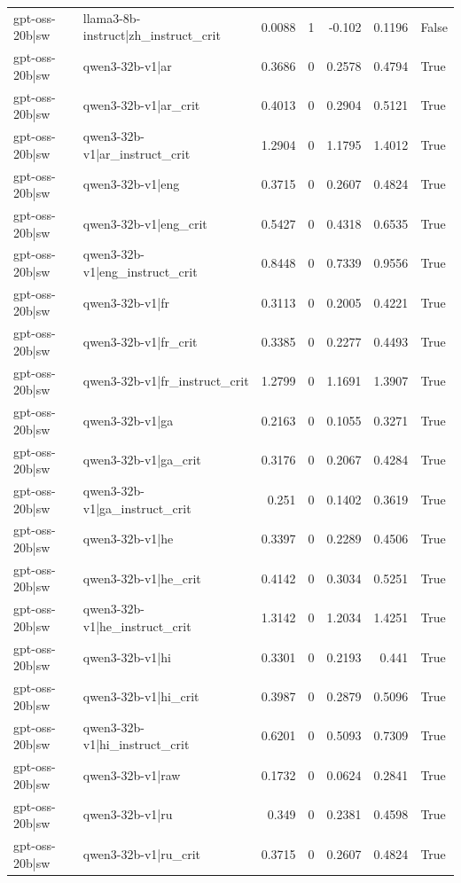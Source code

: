 \begin{table}
\begin{tabular}{l l r r r r l}
gpt-oss-20b|sw & llama3-8b-instruct|zh_instruct_crit & 0.0088 & 1 & -0.102 & 0.1196 & False \\
gpt-oss-20b|sw & qwen3-32b-v1|ar & 0.3686 & 0 & 0.2578 & 0.4794 & True \\
gpt-oss-20b|sw & qwen3-32b-v1|ar_crit & 0.4013 & 0 & 0.2904 & 0.5121 & True \\
gpt-oss-20b|sw & qwen3-32b-v1|ar_instruct_crit & 1.2904 & 0 & 1.1795 & 1.4012 & True \\
gpt-oss-20b|sw & qwen3-32b-v1|eng & 0.3715 & 0 & 0.2607 & 0.4824 & True \\
gpt-oss-20b|sw & qwen3-32b-v1|eng_crit & 0.5427 & 0 & 0.4318 & 0.6535 & True \\
gpt-oss-20b|sw & qwen3-32b-v1|eng_instruct_crit & 0.8448 & 0 & 0.7339 & 0.9556 & True \\
gpt-oss-20b|sw & qwen3-32b-v1|fr & 0.3113 & 0 & 0.2005 & 0.4221 & True \\
gpt-oss-20b|sw & qwen3-32b-v1|fr_crit & 0.3385 & 0 & 0.2277 & 0.4493 & True \\
gpt-oss-20b|sw & qwen3-32b-v1|fr_instruct_crit & 1.2799 & 0 & 1.1691 & 1.3907 & True \\
gpt-oss-20b|sw & qwen3-32b-v1|ga & 0.2163 & 0 & 0.1055 & 0.3271 & True \\
gpt-oss-20b|sw & qwen3-32b-v1|ga_crit & 0.3176 & 0 & 0.2067 & 0.4284 & True \\
gpt-oss-20b|sw & qwen3-32b-v1|ga_instruct_crit & 0.251 & 0 & 0.1402 & 0.3619 & True \\
gpt-oss-20b|sw & qwen3-32b-v1|he & 0.3397 & 0 & 0.2289 & 0.4506 & True \\
gpt-oss-20b|sw & qwen3-32b-v1|he_crit & 0.4142 & 0 & 0.3034 & 0.5251 & True \\
gpt-oss-20b|sw & qwen3-32b-v1|he_instruct_crit & 1.3142 & 0 & 1.2034 & 1.4251 & True \\
gpt-oss-20b|sw & qwen3-32b-v1|hi & 0.3301 & 0 & 0.2193 & 0.441 & True \\
gpt-oss-20b|sw & qwen3-32b-v1|hi_crit & 0.3987 & 0 & 0.2879 & 0.5096 & True \\
gpt-oss-20b|sw & qwen3-32b-v1|hi_instruct_crit & 0.6201 & 0 & 0.5093 & 0.7309 & True \\
gpt-oss-20b|sw & qwen3-32b-v1|raw & 0.1732 & 0 & 0.0624 & 0.2841 & True \\
gpt-oss-20b|sw & qwen3-32b-v1|ru & 0.349 & 0 & 0.2381 & 0.4598 & True \\
gpt-oss-20b|sw & qwen3-32b-v1|ru_crit & 0.3715 & 0 & 0.2607 & 0.4824 & True \\

\end{tabular}
\end{table}
